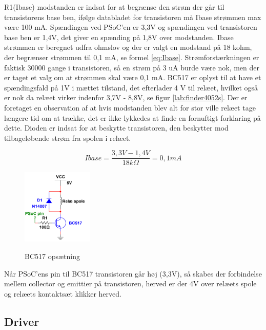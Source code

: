 R1(Ibase) modstanden er indsat for at begrænse den strøm der går til transistorens base ben, ifølge databladet for transistoren må Ibase strømmen max være 100 mA. Spændingen ved PSoC'en er 3,3V og spændingen ved transistoren base ben er 1,4V, det giver en spænding på 1,8V over modstanden. Ibase strømmen er beregnet udfra ohmslov og der er valgt en modstand på 18 kohm, der begrænser strømmen til 0,1 mA, se formel \ref{eq:Ibase}.
\newline \newline
Strømforstærkningen er faktisk 30000 gange i transistoren, så en strøm på 3 uA burde være nok, men der er taget et valg om at strømmen skal være 0,1 mA. BC517 er oplyst til at have et spændingsfald på 1V i mættet tilstand, det efterlader 4 V til relæet, hvilket også er nok da relæet virker indenfor 3,7V - 8,8V, se figur \ref{lab:finder4052s}. Der er foretaget en observation af at hvis modstanden blev alt for stor ville relæet tage længere tid om at trække, det er ikke lykkedes at finde en fornuftigt forklaring på dette. Dioden er indsat for at beskytte transistoren, den beskytter mod tilbageløbende strøm fra spolen i relæet.

\begin{equation} 
Ibase = \frac{3,3V - 1,4V}{18k\Omega} = 0,1mA
\label{eq:Ibase}
\end{equation}

\begin{figure}[H] \centering
{\includegraphics[width=0.3\textwidth]{filer/design/Billeder/BC517}}
\caption{BC517 opsætning}
\label{lab:BC517}
\raggedright
\end{figure} 

Når PSoC'ens pin til BC517 transistoren går høj (3,3V), så skabes der forbindelse mellem collector og emittier på transistoren, herved er der 4V over relæets spole og relæets kontaktsæt klikker herved. 

\subsection{Driver}

